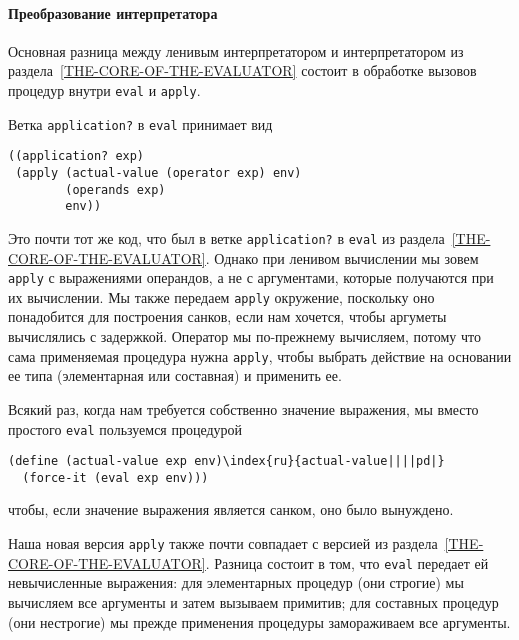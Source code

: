 \paragraph{Преобразование интерпретатора}


Основная разница между ленивым интерпретатором и
интерпретатором из раздела~\ref{THE-CORE-OF-THE-EVALUATOR}
состоит в обработке вызовов процедур внутри {\tt eval} и
{\tt apply}.

Ветка {\tt application?} в {\tt eval}
принимает вид

\begin{Verbatim}[fontsize=\small]
((application? exp)
 (apply (actual-value (operator exp) env)
        (operands exp)
        env))
\end{Verbatim}
Это почти тот же код, что был в ветке {\tt application?}  в
{\tt eval} из раздела~\ref{THE-CORE-OF-THE-EVALUATOR}.
Однако при ленивом вычислении мы зовем 
{\tt apply} с выражениями операндов, а не с аргументами,
которые получаются при их вычислении.  Мы также передаем {\tt apply}
окружение, поскольку оно понадобится для построения санков, если нам
хочется, чтобы аргуметы вычислялись с задержкой.  Оператор мы
по-прежнему вычисляем, потому что сама применяемая процедура нужна
{\tt apply}, чтобы выбрать действие на основании ее типа (элементарная
или составная) и применить ее.

Всякий раз, когда нам требуется собственно значение выражения, мы
вместо простого {\tt eval} пользуемся процедурой

\begin{Verbatim}[fontsize=\small]
(define (actual-value exp env)\index{ru}{actual-value||||pd|}
  (force-it (eval exp env)))
\end{Verbatim}
чтобы, если значение выражения является санком, оно было
вынуждено.

Наша новая версия {\tt apply} также почти
совпадает с версией из 
раздела~\ref{THE-CORE-OF-THE-EVALUATOR}.  Разница состоит в том,
что {\tt eval}
передает ей невычисленные выражения: для
элементарных процедур (они строгие) мы вычисляем все аргументы и затем
вызываем примитив; для составных процедур (они нестрогие) мы прежде
применения процедуры замораживаем все аргументы.

